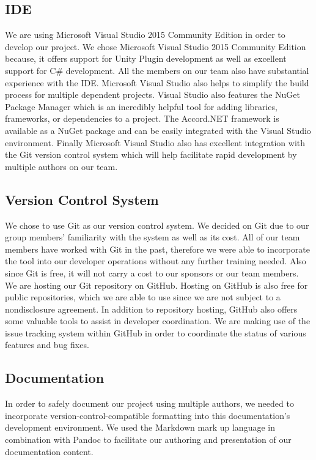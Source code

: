 \documentclass[12pt]{article}
\begin{document}
\subsection{IDE}\label{ide}

We are using Microsoft Visual Studio 2015 Community Edition in order to
develop our project. We chose Microsoft Visual Studio 2015 Community
Edition because, it offers support for Unity Plugin development as well
as excellent support for C\# development. All the members on our team
also have substantial experience with the IDE. Microsoft Visual Studio
also helps to simplify the build process for multiple dependent
projects. Visual Studio also features the NuGet Package Manager which is
an incredibly helpful tool for adding libraries, frameworks, or
dependencies to a project. The Accord.NET framework is available as a
NuGet package and can be easily integrated with the Visual Studio
environment. Finally Microsoft Visual Studio also has excellent
integration with the Git version control system which will help
facilitate rapid development by multiple authors on our team.

\subsection{Version Control System}\label{version-control-system}

We chose to use Git as our version control system. We decided on Git due
to our group members' familiarity with the system as well as its cost.
All of our team members have worked with Git in the past, therefore we
were able to incorporate the tool into our developer operations without
any further training needed. Also since Git is free, it will not carry a
cost to our sponsors or our team members. We are hosting our Git
repository on GitHub. Hosting on GitHub is also free for public
repositories, which we are able to use since we are not subject to a
nondisclosure agreement. In addition to repository hosting, GitHub also
offers some valuable tools to assist in developer coordination. We are
making use of the issue tracking system within GitHub in order to
coordinate the status of various features and bug fixes.

\subsection{Documentation}\label{documentation}

In order to safely document our project using multiple authors, we
needed to incorporate version-control-compatible formatting into this
documentation's development environment. We used the Markdown mark up
language in combination with Pandoc to facilitate our authoring and
presentation of our documentation content.
\end{document}
